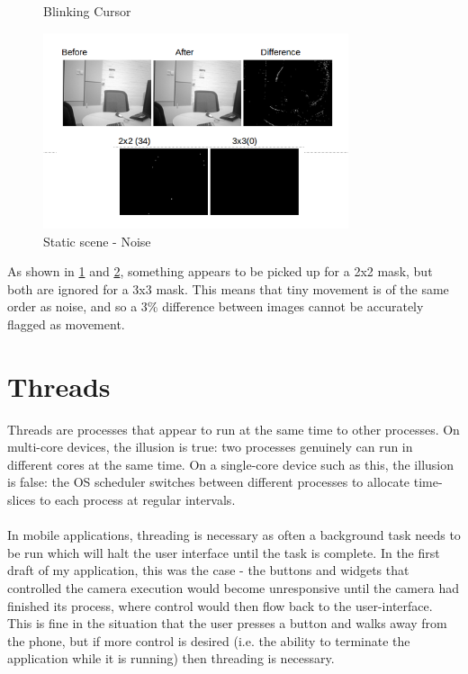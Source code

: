 {{\begin{figure}[H]
\begin{center}
	\end{center}
	\vspace{-20pt}
	\caption{Blinking Cursor}
	\label{img:curse1}
\end{figure}
\begin{figure}[H]
	\begin{center}
		\includegraphics[width=0.8\textwidth]{../images/ImageOps/CURSOR2}
	\end{center}
	\vspace{-20pt}
	\caption{Static scene - Noise}
	\label{fig:curse2}
\end{figure}

As shown in \cref{img:curse1} and \cref{fig:curse2}, something appears to be picked up for a 2x2 mask, but both are ignored for a 3x3 mask. This means that tiny movement is of the same order as noise, and so a 3\% difference between images cannot be accurately flagged as movement.

\section{Threads}
Threads are processes that appear to run at the same time to other processes. On multi-core devices, the illusion is true: two processes genuinely can run in different cores at the same time. On a single-core device such as this, the illusion is false: the OS scheduler switches between different processes to allocate time-slices to each process at regular intervals.\\
\\In mobile applications, threading is necessary as often a background task needs to be run which will halt the user interface until the task is complete. In the first draft of my application, this was the case - the buttons and widgets that controlled the camera execution would become unresponsive until the camera had finished its process, where control would then flow back to the user-interface.
\\This is fine in the situation that the user presses a button and walks away from the phone, but if more control is desired (i.e. the ability to terminate the application while it is running) then threading is necessary.

}}
